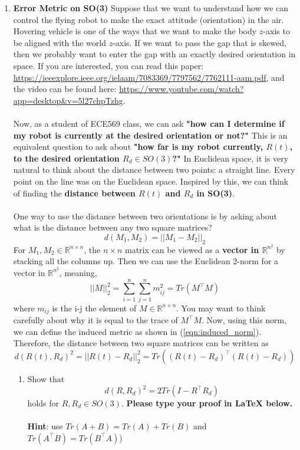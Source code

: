 \documentclass{article}
\numberwithin{figure}{section}
\begin{document}
\begin{enumerate}[label=(\alph*)]
\newpage
\item \textbf{Error Metric on SO(3)}
Suppose that we want to understand how we can control the flying robot to make the exact attitude (orientation) in the air. Hovering vehicle is one of the ways that we want to make the body $z$-axis to be aligned with the world $z$-axis. If we want to pass the gap that is skewed, then we probably want to enter the gap with an exactly desired orientation in space. If you are interested, you can read this paper: \url{https://ieeexplore.ieee.org/ielaam/7083369/7797562/7762111-aam.pdf}, and the video can be found here: \url{https://www.youtube.com/watch?app=desktop&v=5l27chpTzhg}. 
\\
\\
Now, as a student of ECE569 class, we can ask \textbf{"how can I determine if my robot is currently at the desired orientation or not?"} This is an equivalent question to ask about \textbf{"how far is my robot currently, $R(t)$, to the desired orientation $R_d\in SO(3)$?"} In Euclidean space, it is very natural to think about the distance between two points: a straight line. Every point on the line was on the Euclidean space. Inspired by this, we can think of finding the \textbf{distance between $R(t)$ and $R_d$ in SO(3)}.
\\
\\
One way to use the distance between two orientations is by asking about what is the distance between any two square matrices?
\begin{equation}
\label{eqn:induced_norm}
    d(M_1,M_2)=||M_1-M_2||_2
\end{equation}
For $M_1, M_2\in\mathbb{R}^{n\times n}$, the $n\times n$ matrix can be viewed as a \textbf{vector in $\mathbb{R}^{n^2}$} by stacking all the columns up. Then we can use the Euclidean 2-norm for a vector in $\mathbb{R}^{n^2}$, meaning,
\begin{equation}
    ||M||^2_2 = \sum_{i=1}^{n}\sum_{j=1}^{n} m_{ij}^2 = Tr(M^\top M)
\end{equation}
where $m_{ij}$ is the i-j the element of $M\in\mathbb{R}^{n\times n}$. You may want to think carefully about why it is equal to the trace of $M^\top M$. Now, using this norm, we can define the induced metric as shown in (\ref{eqn:induced_norm}). Therefore, the distance between two square matrices can be written as 
\begin{equation}
    d(R(t),R_d)^2 = ||R(t)-R_d||^2_2=Tr((R(t)-R_d)^\top(R(t)-R_d))
\end{equation}
\begin{enumerate}[label=\arabic*.]
\item Show that 
\begin{equation}
    d(R,R_d)^2 = 2Tr(I-R^\top R_d)
\end{equation}
holds for $R, R_d\in SO(3)$. \textbf{Please type your proof in LaTeX below.}
\\
\\
\textbf{Hint}: use $Tr(A+B) = Tr(A) + Tr(B)$ and $Tr(A^\top B)=Tr(B^\top A)$)


\end{enumerate}
\end{enumerate}
\end{document}
